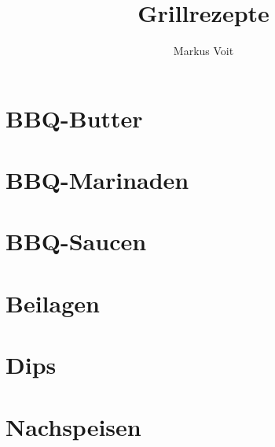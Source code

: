 \documentclass[
  DIV=11,%
  pagesize,%
  fontsize=11pt,%
  paper=a4,%
  numbers=noenddot,
]{scrartcl}
\title{Grillrezepte}
\author{Markus Voit}
\begin{document}
\maketitle

\tableofcontents
\clearpage

\section{BBQ-Butter}
\newpage
\newpage
\newpage
\newpage
\newpage

\section{BBQ-Marinaden}
\newpage
\newpage
\newpage

\section{BBQ-Saucen}
\newpage
\newpage
\newpage
\newpage
\newpage
\newpage
\newpage

\section{Beilagen}
\newpage
\newpage
\newpage

\section{Dips}
\newpage

\section{Nachspeisen}
\newpage
\newpage
\newpage
\newpage
\newpage
\end{document}
